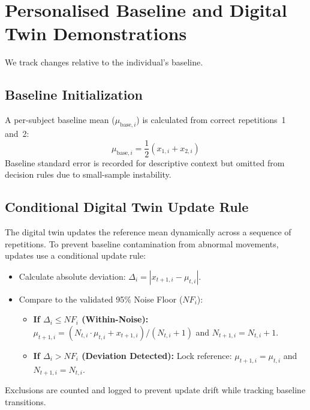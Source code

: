 \section{Personalised Baseline and Digital Twin Demonstrations}
\label{sec:baseline-twin}

We track changes relative to the individual's baseline.

\subsection{Baseline Initialization}
\label{sec:baseline-init}

A per-subject baseline mean ($\mu_{\text{base}, i}$) is calculated from correct repetitions~1 and~2:
\begin{equation}
\mu_{\text{base}, i} = \frac{1}{2} (x_{1, i} + x_{2, i})
\label{eq:baseline-mean}
\end{equation}
Baseline standard error is recorded for descriptive context but omitted from decision rules due to small-sample instability.

\subsection{Conditional Digital Twin Update Rule}
\label{sec:twin-update}

The digital twin updates the reference mean dynamically across a sequence of repetitions. To prevent baseline contamination from abnormal movements, updates use a conditional update rule:
\begin{itemize}
  \item Calculate absolute deviation: $\Delta_i = |x_{t+1, i} - \mu_{t, i}|$.
  \item Compare to the validated 95\% Noise Floor ($NF_i$):
  \begin{itemize}
    \item \textbf{If $\Delta_i \le NF_i$ (Within-Noise):} $\mu_{t+1, i} = (N_{t, i} \cdot \mu_{t, i} + x_{t+1, i})/(N_{t, i} + 1)$ and $N_{t+1, i} = N_{t, i} + 1$.
    \item \textbf{If $\Delta_i > NF_i$ (Deviation Detected):} Lock reference: $\mu_{t+1, i} = \mu_{t, i}$ and $N_{t+1, i} = N_{t, i}$.
  \end{itemize}
\end{itemize}
Exclusions are counted and logged to prevent update drift while tracking baseline transitions.


